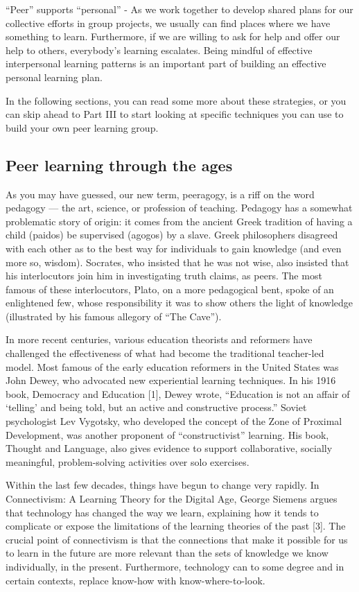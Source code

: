 ``Peer'' supports ``personal'' - As we work together to develop shared
plans for our collective efforts in group projects, we usually can find
places where we have something to learn. Furthermore, if we are willing
to ask for help and offer our help to others, everybody's learning
escalates. Being mindful of effective interpersonal learning patterns is
an important part of building an effective personal learning plan.

In the following sections, you can read some more about these
strategies, or you can skip ahead to Part III to start looking at
specific techniques you can use to build your own peer learning group.

\subsection{Peer learning through the ages}

As you may have guessed, our new term, peeragogy, is a riff on the word
pedagogy --- the art, science, or profession of teaching. Pedagogy has a
somewhat problematic story of origin: it comes from the ancient Greek
tradition of having a child (paidos) be supervised (agogos) by a slave.
Greek philosophers disagreed with each other as to the best way for
individuals to gain knowledge (and even more so, wisdom). Socrates, who
insisted that he was not wise, also insisted that his interlocutors join
him in investigating truth claims, as peers. The most famous of these
interlocutors, Plato, on a more pedagogical bent, spoke of an
enlightened few, whose responsibility it was to show others the light of
knowledge (illustrated by his famous allegory of ``The Cave'').

In more recent centuries, various education theorists and reformers have
challenged the effectiveness of what had become the traditional
teacher-led model. Most famous of the early education reformers in the
United States was John Dewey, who advocated new experiential learning
techniques. In his 1916 book, Democracy and Education {[}1{]}, Dewey
wrote, ``Education is not an affair of `telling' and being told, but an
active and constructive process.'' Soviet psychologist Lev Vygotsky, who
developed the concept of the Zone of Proximal Development, was another
proponent of ``constructivist'' learning. His book, Thought and
Language, also gives evidence to support collaborative, socially
meaningful, problem-solving activities over solo exercises.

Within the last few decades, things have begun to change very rapidly.
In Connectivism: A Learning Theory for the Digital Age, George Siemens
argues that technology has changed the way we learn, explaining how it
tends to complicate or expose the limitations of the learning theories
of the past {[}3{]}. The crucial point of connectivism is that the
connections that make it possible for us to learn in the future are more
relevant than the sets of knowledge we know individually, in the
present. Furthermore, technology can to some degree and in certain
contexts, replace know-how with know-where-to-look.

